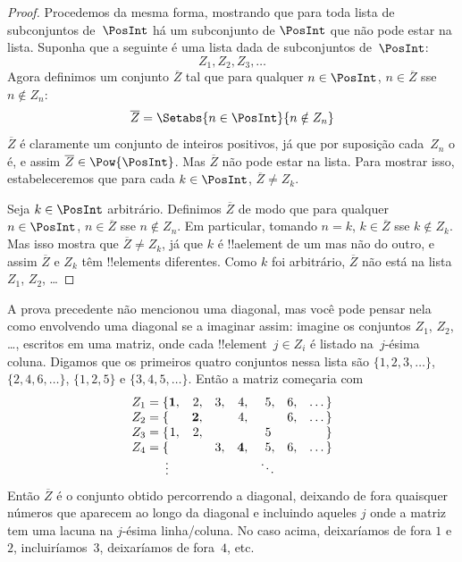 \documentclass[../../../include/open-logic-section]{subfiles}
\begin{document}
\begin{proof}
Procedemos da mesma forma, mostrando que para toda lista de subconjuntos
de~$\PosInt$ há um subconjunto de $\PosInt$ que não pode estar na lista.
Suponha que a seguinte é uma lista dada de subconjuntos de~$\PosInt$:
\[
Z_{1}, Z_{2}, Z_{3}, \dots
\]
Agora definimos um conjunto $\overline{Z}$ tal que para qualquer $n \in \PosInt$,
$n \in \overline{Z}$ sse $n \notin Z_{n}$:
\[
\overline{Z} = \Setabs{n \in \PosInt}{n \notin Z_n}
\]
$\overline{Z}$ é claramente um conjunto de inteiros positivos, já que por
suposição cada~$Z_n$ o é, e assim $\overline{Z} \in
\Pow{\PosInt}$. Mas $\overline{Z}$ não pode estar na lista. Para mostrar
isso, estabeleceremos que para cada $k \in \PosInt$, $\overline{Z} \neq
Z_k$.

Seja $k \in \PosInt$ arbitrário. Definimos $\overline{Z}$ de modo que
para qualquer $n \in \PosInt$, $n \in \overline{Z}$ sse $n \notin Z_n$.
Em particular, tomando $n=k$, $k \in \overline{Z}$ sse $k \notin Z_k$.
Mas isso mostra que $\overline{Z} \neq Z_k$, já que $k$ é !!a{element}
de um mas não do outro, e assim $\overline{Z}$ e $Z_k$ têm
!!{element}s diferentes. Como $k$ foi arbitrário, $\overline{Z}$ não está
na lista $Z_1$, $Z_2$, \dots
\end{proof}

\begin{explain}
A prova precedente não mencionou uma diagonal, mas você pode pensar nela
como envolvendo uma diagonal se a imaginar assim: imagine os
conjuntos $Z_1$, $Z_2$, \dots, escritos em uma matriz, onde cada
!!{element}~$j \in Z_i$ é listado na~$j$-ésima coluna. Digamos que os primeiros
quatro conjuntos nessa lista são $\{1,2,3,\dots\}$, $\{2, 4, 6, \dots\}$,
$\{1,2,5\}$ e $\{3,4,5,\dots\}$. Então a matriz começaria com
\[
\begin{array}{r@{}rrrrrrr}
  Z_1 = \{ & \mathbf{1}, & 2, & 3, & 4, & 5, & 6, & \dots\}\\
  Z_2 = \{ &  & \mathbf{2}, &  & 4, &  & 6, & \dots\}\\
  Z_3 = \{ & 1, & 2, &  &  & 5\phantom{,} &  & \}\\
  Z_4 = \{ &  &  & 3, & \mathbf{4}, & 5, & 6, & \dots\}\\
  \vdots & & & & & \ddots
\end{array}
\]
Então $\overline{Z}$ é o conjunto obtido percorrendo a diagonal,
deixando de fora quaisquer números que aparecem ao longo da diagonal e incluindo
aqueles $j$ onde a matriz tem uma lacuna na $j$-ésima linha/coluna. No
caso acima, deixaríamos de fora $1$ e $2$, incluiríamos~$3$, deixaríamos
de fora~$4$, etc.
\end{explain}
\end{document}
